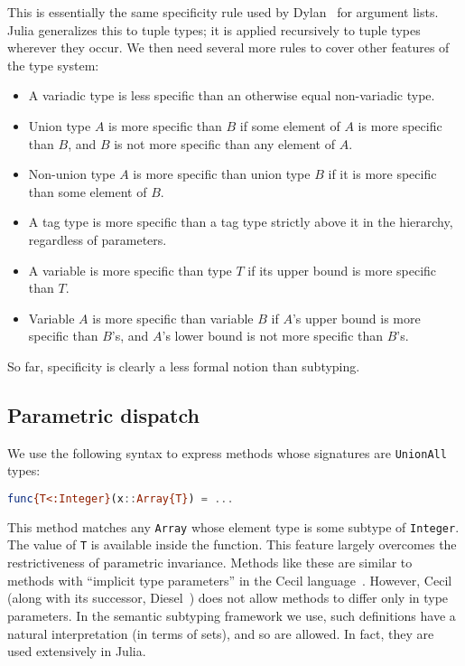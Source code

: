 
This is essentially the same specificity rule used by Dylan~\cite{dylanlang}
for argument lists.
Julia generalizes this to tuple types; it is applied recursively to tuple
types wherever they occur.
We then need several more rules to cover other features of the type system:

\begin{itemize}
\item A variadic type is less specific than an otherwise equal non-variadic type.
\item Union type $A$ is more specific than $B$ if some element of $A$ is
more specific than $B$, and $B$ is not more specific than any
element of $A$.
\item Non-union type $A$ is more specific than union type $B$ if it is more specific
than some element of $B$.
\item A tag type is more specific than a tag type strictly above it in the
hierarchy, regardless of parameters.
\item A variable is more specific than type $T$ if its upper bound is more specific
than $T$.
\item Variable $A$ is more specific than variable $B$ if $A$'s upper bound is
more specific than $B$'s, and $A$'s lower bound is not more specific than $B$'s.
\end{itemize}

So far, specificity is clearly a less formal notion than subtyping.

\subsection{Parametric dispatch}

We use the following syntax to express methods whose signatures
are \texttt{UnionAll} types:

\begin{singlespace}
\begin{lstlisting}[language=julia]
func{T<:Integer}(x::Array{T}) = ...
\end{lstlisting}
\end{singlespace}

\noindent
This method matches any \texttt{Array} whose element type is some subtype
of \texttt{Integer}.
The value of \texttt{T} is available inside the function.
This feature largely overcomes the restrictiveness of parametric invariance.
Methods like these are similar to methods with ``implicit type parameters''
in the Cecil language~\cite{cecilspec}.
However, Cecil (along with its successor, Diesel~\cite{chambers2006diesel})
does not allow methods to differ only in type parameters.
In the semantic subtyping framework we use, such definitions have a
natural interpretation (in terms of sets), and so are allowed.
In fact, they are used extensively in Julia.

